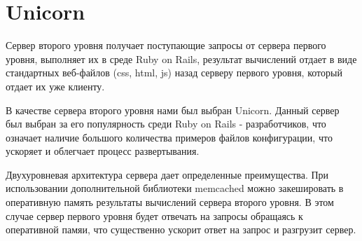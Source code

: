 \section{Unicorn}
Сервер второго уровня получает поступающие запросы от сервера первого уровня,
выполняет их в среде Ruby on Rails, результат вычислений отдает в виде
стандартных веб-файлов (css, html, js) назад серверу первого уровня, который
отдает  их уже клиенту.

В качестве сервера второго уровня нами был выбран Unicorn. Данный сервер был
выбран за его популярность среди Ruby on Rails - разработчиков, что означает
наличие большого количества примеров файлов конфигурации, что ускоряет и
облегчает процесс развертывания.

Двухуровневая архитектура сервера дает определенные преимущества. При
использовании дополнительной библиотеки memcached можно закешировать в
оперативную память результаты вычислений сервера второго уровня. В этом случае
сервер первого уровня будет отвечать на запросы обращаясь к оперативной памяи,
что существенно ускорит ответ на запрос и разгрузит сервер.